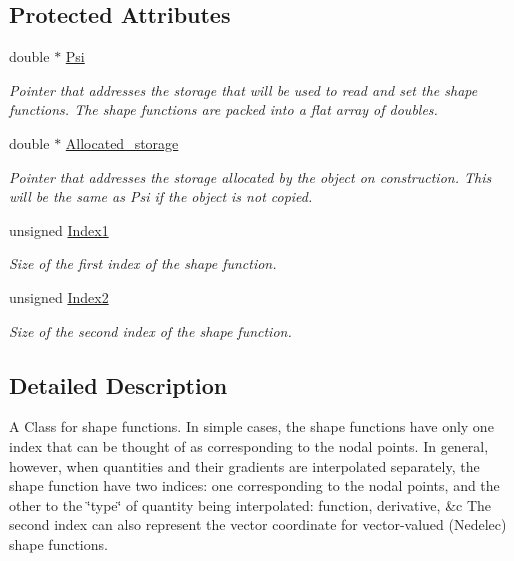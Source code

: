 \subsection*{Protected Attributes}
\begin{DoxyCompactItemize}
\item 
double $\ast$ \hyperlink{classoomph_1_1Shape_ae045962e578d675877663404b177d301}{Psi}
\begin{DoxyCompactList}\small\item\em Pointer that addresses the storage that will be used to read and set the shape functions. The shape functions are packed into a flat array of doubles. \end{DoxyCompactList}\item 
double $\ast$ \hyperlink{classoomph_1_1Shape_a32c202fd82d361e354d7cf19615f162f}{Allocated\+\_\+storage}
\begin{DoxyCompactList}\small\item\em Pointer that addresses the storage allocated by the object on construction. This will be the same as Psi if the object is not copied. \end{DoxyCompactList}\item 
unsigned \hyperlink{classoomph_1_1Shape_a63638007c6e3b84b57a023432c43ceb1}{Index1}
\begin{DoxyCompactList}\small\item\em Size of the first index of the shape function. \end{DoxyCompactList}\item 
unsigned \hyperlink{classoomph_1_1Shape_aae154e349eaa0a2f4b415c2bdaef0708}{Index2}
\begin{DoxyCompactList}\small\item\em Size of the second index of the shape function. \end{DoxyCompactList}\end{DoxyCompactItemize}


\subsection{Detailed Description}
A Class for shape functions. In simple cases, the shape functions have only one index that can be thought of as corresponding to the nodal points. In general, however, when quantities and their gradients are interpolated separately, the shape function have two indices\+: one corresponding to the nodal points, and the other to the \char`\"{}type\char`\"{} of quantity being interpolated\+: function, derivative, \&c The second index can also represent the vector coordinate for vector-\/valued (Nedelec) shape functions.

